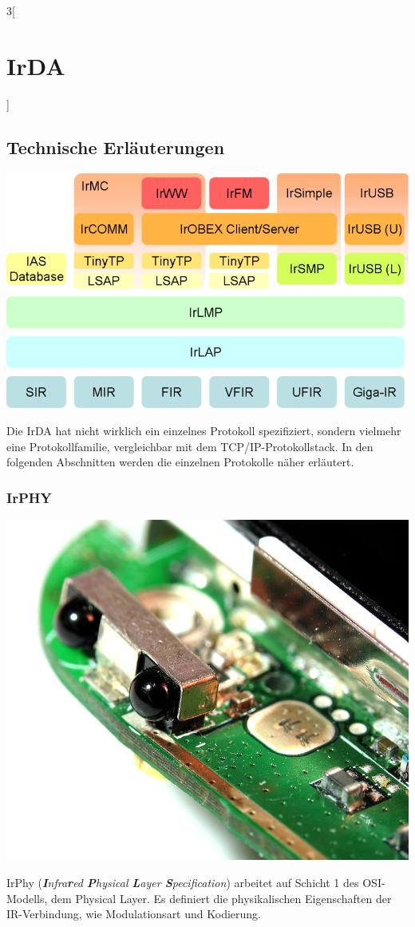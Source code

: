 \begin{multicols}{3}[\section{IrDA}]
\subsection*{Technische Erläuterungen}
\begin{Figure}
\includegraphics[width=\linewidth]{Kapitel/IrDA/Grafiken/protocol_stack.png}
\label{fig:irda.stack}
\end{Figure}
Die IrDA hat nicht wirklich ein einzelnes Protokoll spezifiziert, sondern vielmehr eine Protokollfamilie, vergleichbar mit dem TCP/IP-Protokollstack. In den folgenden Abschnitten werden die einzelnen Protokolle näher erläutert.
\subsubsection*{IrPHY}

\begin{Figure}
\includegraphics[width=\linewidth]{Kapitel/IrDA/Grafiken/irda_trans.jpg}
\label{fig:irda.transceiver}
\end{Figure}
IrPhy (\textit{\textbf{I}nfra\textbf{r}ed \textbf{P}hysical \textbf{L}ayer \textbf{S}pecification}) arbeitet auf Schicht 1 des OSI-Modells, dem Physical Layer. Es definiert die physikalischen Eigenschaften der IR-Verbindung, wie Modulationsart und Kodierung.


\end{multicols}
